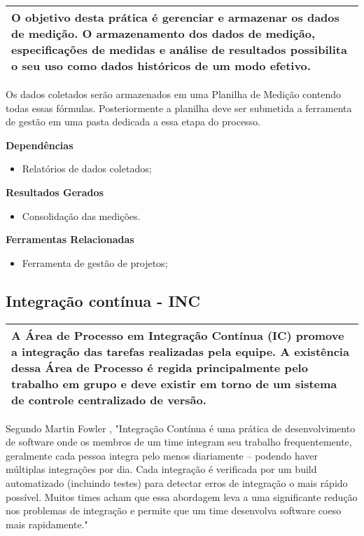 \begin{table}[!ht]
\centering
\begin{tabular}{|p{130mm}|}
\hline
O objetivo desta prática é gerenciar e armazenar os dados de medição. O armazenamento dos dados de medição, especificações de medidas e análise de resultados possibilita o seu uso como dados históricos de um modo efetivo. \\ 
\hline
\end{tabular}
\end{table}

Os dados coletados serão armazenados em uma Planilha de Medição contendo todas essas fórmulas. Posteriormente a planilha deve ser submetida a ferramenta de gestão em uma pasta dedicada a essa etapa do processo.

\textbf{Dependências}

\begin{itemize}
\item Relatórios de dados coletados;
\end{itemize}

\textbf{ Resultados Gerados }
\begin{itemize}
\item Consolidação das medições.
\end{itemize}

\textbf{ Ferramentas Relacionadas }
\begin{itemize}
\item Ferramenta de gestão de projetos;
\end{itemize}

\subsection{Integração contínua - INC}
\label{sec:inc}

\begin{table}[!ht]
\centering
\begin{tabular}{|p{130mm}|}
\hline
A Área de Processo em Integração Contínua (IC) promove a integração das tarefas realizadas pela equipe. A existência dessa Área de Processo é regida principalmente pelo trabalho em grupo e deve existir em torno de um sistema de controle centralizado de versão. \\
\hline
\end{tabular}
\end{table}

Segundo Martin Fowler \cite{Beck2001}, "Integração Contínua é uma prática de desenvolvimento de software onde os membros de um time integram seu trabalho frequentemente, geralmente cada pessoa integra pelo menos diariamente – podendo haver múltiplas integrações por dia. Cada integração é verificada por um build automatizado (incluindo testes) para detectar erros de integração o mais rápido possível. Muitos times acham que essa abordagem leva a uma significante redução nos problemas de integração e permite que um time desenvolva software coeso mais rapidamente."

